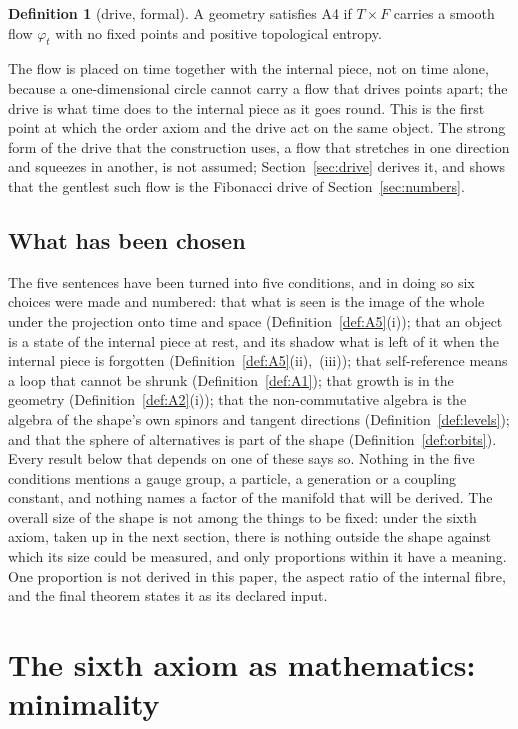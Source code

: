 \documentclass[11pt,a4paper]{article}
\theoremstyle{plain}
\theoremstyle{definition}
\newtheorem{definition}[theorem]{Definition}
\theoremstyle{remark}
\begin{document}
\begin{definition}[drive, formal]\label{def:A4}
A geometry satisfies A4 if $T\times F$ carries a smooth flow $\varphi_{t}$ with no fixed points and positive topological entropy.
\end{definition}

The flow is placed on time together with the internal piece, not on time alone, because a one-dimensional circle cannot carry a flow that drives points apart; the drive is what time does to the internal piece as it goes round. This is the first point at which the order axiom and the drive act on the same object. The strong form of the drive that the construction uses, a flow that stretches in one direction and squeezes in another, is not assumed; Section~\ref{sec:drive} derives it, and shows that the gentlest such flow is the Fibonacci drive of Section~\ref{sec:numbers}.

\subsection{What has been chosen}\label{sec:scope}

The five sentences have been turned into five conditions, and in doing so six choices were made and numbered: that what is seen is the image of the whole under the projection onto time and space (Definition~\ref{def:A5}(i)); that an object is a state of the internal piece at rest, and its shadow what is left of it when the internal piece is forgotten (Definition~\ref{def:A5}(ii),~(iii)); that self-reference means a loop that cannot be shrunk (Definition~\ref{def:A1}); that growth is in the geometry (Definition~\ref{def:A2}(i)); that the non-commutative algebra is the algebra of the shape's own spinors and tangent directions (Definition~\ref{def:levels}); and that the sphere of alternatives is part of the shape (Definition~\ref{def:orbits}). Every result below that depends on one of these says so. Nothing in the five conditions mentions a gauge group, a particle, a generation or a coupling constant, and nothing names a factor of the manifold that will be derived. The overall size of the shape is not among the things to be fixed: under the sixth axiom, taken up in the next section, there is nothing outside the shape against which its size could be measured, and only proportions within it have a meaning. One proportion is not derived in this paper, the aspect ratio of the internal fibre, and the final theorem states it as its declared input.

\section{The sixth axiom as mathematics: minimality}\label{sec:minimal}
\end{document}
